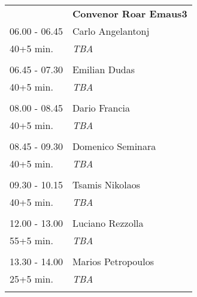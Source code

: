\begin{longtable}{p{3cm}p{13cm}}
&\hfill {\bf Convenor Roar Emaus3 }\\ 
06.00 - 06.45 & Carlo Angelantonj\\ 
40+5 min. & {\it TBA}\\ 
 & \\ 
06.45 - 07.30 & Emilian Dudas\\ 
40+5 min. & {\it TBA}\\ 
 & \\ 
08.00 - 08.45 & Dario Francia\\ 
40+5 min. & {\it TBA}\\ 
 & \\ 
08.45 - 09.30 & Domenico Seminara\\ 
40+5 min. & {\it TBA}\\ 
 & \\ 
09.30 - 10.15 & Tsamis Nikolaos\\ 
40+5 min. & {\it TBA}\\ 
 & \\ 
12.00 - 13.00 & Luciano Rezzolla\\ 
55+5 min. & {\it TBA}\\ 
 & \\ 
13.30 - 14.00 & Marios Petropoulos\\ 
25+5 min. & {\it TBA}\\ 
 & \\ 
\end{longtable}

